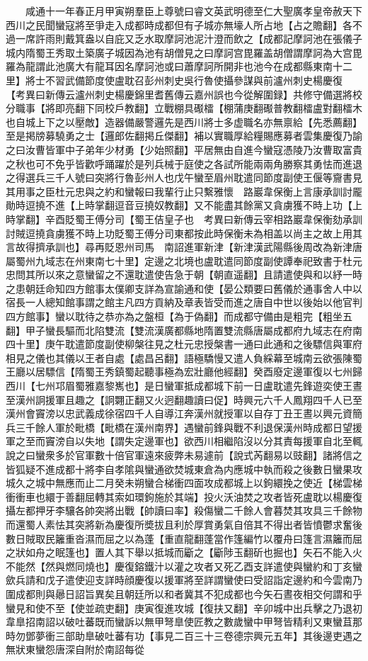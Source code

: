 　　咸通十一年春正月甲寅朔羣臣上尊號曰睿文英武明德至仁大聖廣孝皇帝赦天下　西川之民聞蠻寇將至爭走入成都時成都但有子城亦無壕人所占地【占之贍翻】各不過一席許雨則戴箕盎以自庇又乏水取摩訶池泥汁澄而飲之【成都記摩訶池在張儀子城内隋蜀王秀取土築廣子城因為池有胡僧見之曰摩訶宫毘羅盖胡僧謂摩訶為大宫毘羅為龍謂此池廣大有龍耳因名摩訶池或曰蕭摩訶所開非也池今在成都縣東南十二里】將士不習武備節度使盧耽召彭州刺史吳行魯使攝參謀與前瀘州刺史楊慶復　【考異曰新傳云瀘州刺史楊慶錦里耆舊傳云嘉州誤也今從解圍録】共修守備選將校分職事【將即亮翻下同校戶教翻】立戰棚具礟檑【棚蒲庚翻礟普教翻檑盧對翻檑木也自城上下之以壓敵】造器備嚴警邏先是西川將士多虚職名亦無禀給【先悉薦翻】至是掲牓募驍勇之士【邏郎佐翻掲丘傑翻】補以實職厚給糧賜應募者雲集慶復乃諭之曰汝曹皆軍中子弟年少材勇【少始照翻】平居無由自進今蠻寇憑陵乃汝曹取富貴之秋也可不免乎皆歡呼踊躍於是列兵械于庭使之各試所能兩兩角勝察其勇怯而進退之得選兵三千人號曰突將行魯彭州人也戊午蠻至眉州耽遣同節度副使王偃等齎書見其用事之臣杜元忠與之約和蠻報曰我輩行止只繫雅懷　路巖韋保衡上言康承訓討龎勛時逗撓不進【上時掌翻逗音豆撓奴教翻】又不能盡其餘黨又貪虜獲不時上功【上時掌翻】辛酉貶蜀王傅分司【蜀王佶皇子也　考異曰新傳云宰相路巖韋保衡劾承訓討賊逗撓貪虜獲不時上功貶蜀王傅分司東都按此時保衡未為相盖以尚主之故上用其言故得擠承訓也】尋再貶恩州司馬　南詔進軍新津【新津漢武陽縣後周改為新津唐屬蜀州九域志在州東南七十里】定邊之北境也盧耽遣同節度副使譚奉祀致書于杜元忠問其所以來之意蠻留之不還耽遣使告急于朝【朝直遥翻】且請遣使與和以紓一時之患朝廷命知四方館事太僕卿支詳為宣諭通和使【晏公類要曰舊儀於通事舍人中以宿長一人總知館事謂之館主凡四方貢納及章表皆受而進之唐自中世以後始以他官判四方館事】蠻以耽待之恭亦為之盤桓【為于偽翻】而成都守備由是粗完【粗坐五翻】甲子蠻長驅而北陷雙流【雙流漢廣都縣地隋置雙流縣唐屬成都府九域志在府南四十里】庚午耽遣節度副使柳槃往見之杜元忠授槃書一通曰此通和之後驃信與軍府相見之儀也其儀以王者自處【處昌呂翻】語極驕慢又遣人負綵幕至城南云欲張陳蜀王廳以居驃信【隋蜀王秀鎮蜀起聽事極為宏壯廳他經翻】癸酉廢定邊軍復以七州歸西川【七州邛眉蜀雅嘉黎嶲也】是日蠻軍抵成都城下前一日盧耽遣先鋒遊奕使王晝至漢州詗援軍且趣之【詗翾正翻又火迥翻趣讀曰促】時興元六千人鳳翔四千人已至漢州會竇滂以忠武義成徐宿四千人自導江奔漢州就授軍以自存丁丑王晝以興元資簡兵三千餘人軍於毗橋【毗橋在漢州南界】遇蠻前鋒與戰不利退保漢州時成都日望援軍之至而竇滂自以失地【謂失定邊軍也】欲西川相繼陷沒以分其責每援軍自北至輒說之曰蠻衆多於官軍數十倍官軍遠來疲弊未易遽前【說式芮翻易以豉翻】諸將信之皆狐疑不進成都十將李自孝隂與蠻通欲焚城東倉為内應城中執而殺之後數日蠻果攻城久之城中無應而止二月癸未朔蠻合梯衝四面攻成都城上以鉤繯挽之使近【梯雲梯衝衝車也繯于善翻屈轉其索如環鉤施於其端】投火沃油焚之攻者皆死盧耽以楊慶復攝左都押牙李驤各帥突將出戰【帥讀曰率】殺傷蠻二千餘人會暮焚其攻具三千餘物而還蜀人素怯其突將新為慶復所奬拔且利於厚賞勇氣自倍其不得出者皆憤鬱求奮後數日賊取民籬重沓濕而屈之以為蓬【重直龍翻蓬當作篷編竹以覆舟曰篷言濕籬而屈之狀如舟之眠篷也】置人其下舉以抵城而斸之【斸陟玉翻斫也掘也】矢石不能入火不能然【然與燃同燒也】慶復鎔鐵汁以灌之攻者又死乙酉支詳遣使與蠻約和丁亥蠻歛兵請和戊子遣使迎支詳時顔慶復以援軍將至詳謂蠻使曰受詔詣定邊約和今雲南乃圍成都則與曏日詔旨異矣且朝廷所以和者冀其不犯成都也今矢石晝夜相交何謂和乎蠻見和使不至【使並疏吏翻】庚寅復進攻城【復扶又翻】辛卯城中出兵擊之乃退初韋臯招南詔以破吐蕃既而蠻訴以無甲弩臯使匠教之數歲蠻中甲弩皆精利又東蠻苴那時勿鄧夢衝三部助臯破吐蕃有功【事見二百三十三卷德宗興元五年】其後邊吏遇之無狀東蠻怨唐深自附於南詔每從